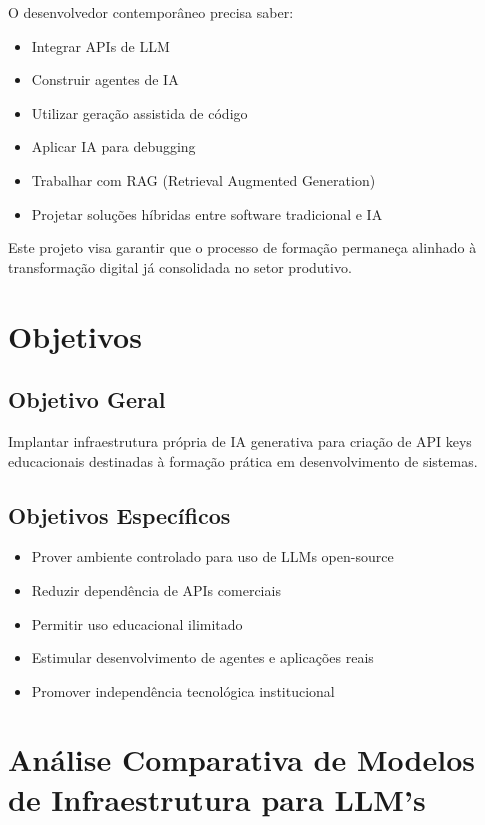 \documentclass[12pt,a4paper,]{abntex2}
\begin{document}
O desenvolvedor contemporâneo precisa saber:

\begin{itemize}
\item Integrar APIs de LLM
\item Construir agentes de IA
\item Utilizar geração assistida de código
\item Aplicar IA para debugging
\item Trabalhar com RAG (Retrieval Augmented Generation)
\item Projetar soluções híbridas entre software tradicional e IA
\end{itemize}

Este projeto visa garantir que o processo de formação permaneça alinhado à transformação digital já consolidada no setor produtivo.

\chapter{Objetivos}

\section{Objetivo Geral}

Implantar infraestrutura própria de IA generativa para criação de API keys educacionais destinadas à formação prática em desenvolvimento de sistemas.

\section{Objetivos Específicos}

\begin{itemize}
\item Prover ambiente controlado para uso de LLMs open-source
\item Reduzir dependência de APIs comerciais
\item Permitir uso educacional ilimitado
\item Estimular desenvolvimento de agentes e aplicações reais
\item Promover independência tecnológica institucional
\end{itemize}

\newpage
\chapter{Análise Comparativa de Modelos de Infraestrutura para LLM's}
\end{document}
